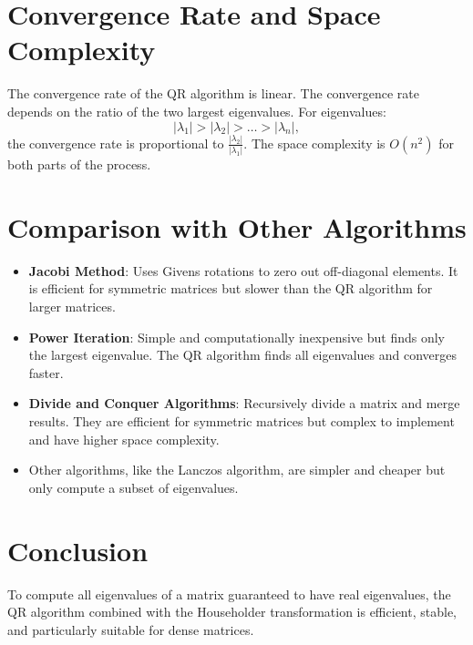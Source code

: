 \documentclass[12pt,letterpaper,onecolumn]{exam}
\begin{document}
\section{Convergence Rate and Space Complexity}
The convergence rate of the QR algorithm is linear. The convergence rate depends on the ratio of the two largest eigenvalues. For eigenvalues:
\[
|\lambda_1| > |\lambda_2| > \dots > |\lambda_n|,
\]
the convergence rate is proportional to $\frac{|\lambda_2|}{|\lambda_1|}$. The space complexity is $O(n^2)$ for both parts of the process.

\section{Comparison with Other Algorithms}
\begin{itemize}
    \item \textbf{Jacobi Method}: Uses Givens rotations to zero out off-diagonal elements. It is efficient for symmetric matrices but slower than the QR algorithm for larger matrices.
    \item \textbf{Power Iteration}: Simple and computationally inexpensive but finds only the largest eigenvalue. The QR algorithm finds all eigenvalues and converges faster.
    \item \textbf{Divide and Conquer Algorithms}: Recursively divide a matrix and merge results. They are efficient for symmetric matrices but complex to implement and have higher space complexity.
    \item Other algorithms, like the Lanczos algorithm, are simpler and cheaper but only compute a subset of eigenvalues.
\end{itemize}

\section{Conclusion}
To compute all eigenvalues of a matrix guaranteed to have real eigenvalues, the QR algorithm combined with the Householder transformation is efficient, stable, and particularly suitable for dense matrices.
\end{document}
